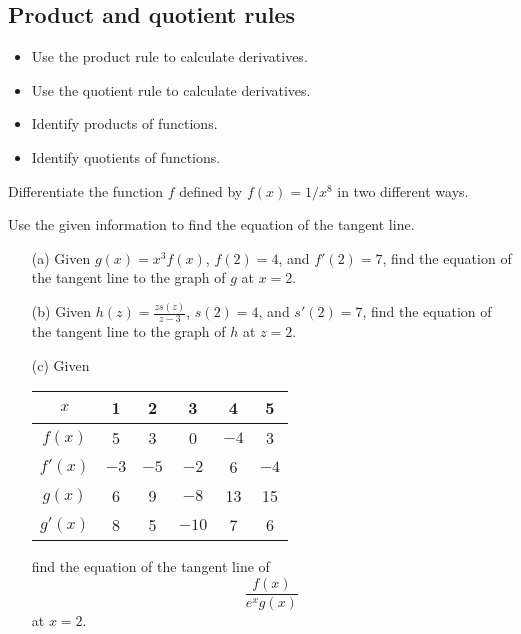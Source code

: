 \documentclass[handout,nooutcomes]{ximera}
\begin{document}
\subsection*{Product and quotient rules}
\begin{itemize}
  \item
    Use the product rule to calculate derivatives. 

  \item 
    Use the quotient rule to calculate derivatives. 

  \item 
    Identify products of functions.

  \item
    Identify quotients of functions.
\end{itemize}
\newpage

\begin{problem}
  Differentiate the function $f$ defined by $f(x) = 1/x^8$ in two different ways.
\end{problem}

\begin{problem}
    Use the given information to find the equation of the tangent line.
  \begin{itemize}
    \item[(a)]
      Given $g(x) = x^3 f(x)$, $f(2) = 4$, and $f'(2) = 7$, find the equation of the tangent line to the graph of $g$ at $x = 2$.

    \item[(b)]
      Given $h(z) = \frac{z s(z)}{z-3}$, $s(2) = 4$, and $s'(2) = 7$, find the equation of the tangent line to the graph of $h$ at $z = 2$.

    \item[(c)]
      Given
      \begin{center}
        \begin{tabular}{cccccc}
          \toprule
          $x$ & 1 & 2 & 3 & 4 & 5\\
          \midrule
          $f(x)$ & 5 & 3 & 0 &$-4$ & 3\\
          $f'(x)$ & $-3$ & $-5$ & $-2$ & 6& $-4$\\
          $g(x)$ & 6 &9&$-8$&13&15\\
          $g'(x)$ & 8 & 5 & $-10$ &7& 6\\
          \bottomrule
        \end{tabular}
      \end{center}
      find the equation of the tangent line of 
      \[
        \frac{f(x)}{e^xg(x)}
      \]
      at $x = 2$.
  \end{itemize}
\end{problem}
\end{document}
